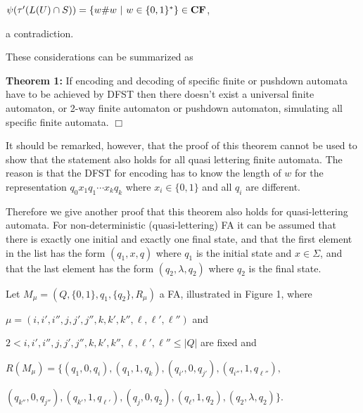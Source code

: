 \documentclass{eptcs}
\begin{document}
$\psi(\tau'(L(U)\cap S)) = \{w{\#}w\ |\ w\in\{0,1\}^*\}\in {\bf CF}$,

a contradiction.

\bigskip

These considerations can be summarized as

\medskip

\noindent
{\bf Theorem 1:} If encoding and decoding of specific finite or pushdown automata
have to be
achieved by DFST then there doesn't exist a universal finite automaton,
or
2-way finite automaton or pushdown automaton, simulating all specific
finite automata.
\hfill$\Box$

\bigskip

It should be remarked, however, that the proof of this theorem cannot be used to
show that the statement also holds for all quasi lettering finite automata.
The reason is that the DFST for encoding has to know the length of $w$ for the
representation $q_0x_1q_1\cdots x_kq_k$ where $x_i\in\{0,1\}$ and all $q_i$
are different.

Therefore we give another proof that this theorem also holds for quasi-lettering
automata. For non-deterministic (quasi-lettering) FA it can be assumed that there
is exactly one initial and exactly one final state, and that the first element
in the list has the form $(q_1,x,q)$ where $q_1$ is the initial state and
$x\in\Sigma$, and that the last element has the form $(q_2,\lambda,q_2)$ where
$q_2$ is the final state.

\medskip

Let
$M_{\mu}=(Q,\{0,1\},q_1,\{q_2\},R_{\mu})$
 a FA, illustrated in Figure 1, where
 
\noindent 
  $\mu=(i,i',i'',j,j',j'',k,k',k'',\ell,\ell',\ell'')$ and

\noindent
  $2<i,i',i'',j,j',j'',k,k',k'',\ell,\ell',\ell''\leq |Q|$
are fixed and













$R(M_{\mu})=\{(q_1,0,q_i),(q_1,1,q_k),(q_{i'},0,q_{j'}),(q_{i''},1,q_{\ell''}),$

\hspace{1.2cm}$(q_{k''},0,q_{j''}),(q_{k'},1,q_{\ell'}),(q_j,0,q_2),(q_{\ell},1,q_2),(q_2,\lambda,q_2)\}$.
\end{document}
